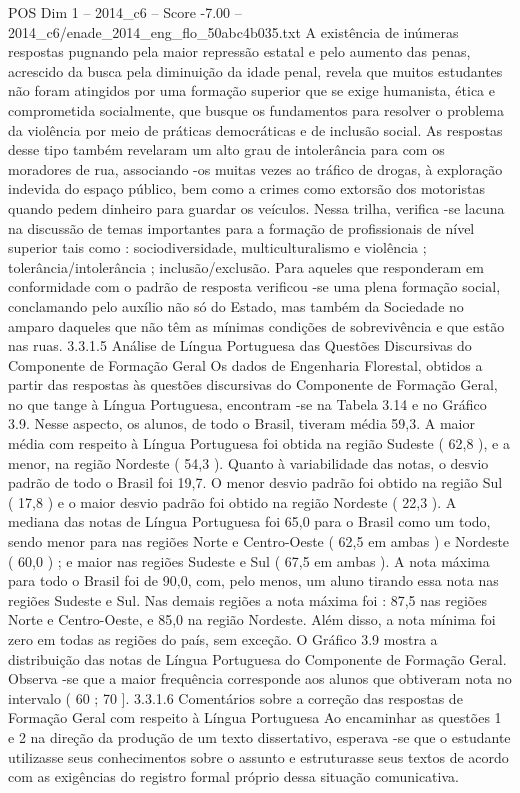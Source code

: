 \begin{textsample}{POS Dim 1 – 2014\_c6 – Score -7.00 – 2014\_c6/enade\_2014\_eng\_flo\_50abc4b035.txt}
A existência de inúmeras respostas pugnando pela maior repressão estatal e pelo aumento das penas, acrescido da busca pela diminuição da idade penal, revela que muitos estudantes não foram atingidos por uma formação superior que se exige humanista, ética e comprometida socialmente, que busque os fundamentos para resolver o problema da violência por meio de práticas democráticas e de inclusão social.
As respostas desse tipo também revelaram um alto grau de intolerância para com os moradores de rua, associando -os muitas vezes ao tráfico de drogas, à exploração indevida do espaço público, bem como a crimes como extorsão dos motoristas quando pedem dinheiro para guardar os veículos.
Nessa trilha, verifica -se lacuna na discussão de temas importantes para a formação de profissionais de nível superior tais como : sociodiversidade, multiculturalismo e violência ; tolerância/intolerância ; inclusão/exclusão.
Para aqueles que responderam em conformidade com o padrão de resposta verificou -se uma plena formação social, conclamando pelo auxílio não só do Estado, mas também da Sociedade no amparo daqueles que não têm as mínimas condições de sobrevivência e que estão nas ruas. 3.3.1.5 Análise de Língua Portuguesa das Questões Discursivas do Componente de Formação Geral Os dados de Engenharia Florestal, obtidos a partir das respostas às questões discursivas do Componente de Formação Geral, no que tange à Língua Portuguesa, encontram -se na Tabela 3.14 e no Gráfico 3.9.
Nesse aspecto, os alunos, de todo o Brasil, tiveram média 59,3.
A maior média com respeito à Língua Portuguesa foi obtida na região Sudeste ( 62,8 ), e a menor, na região Nordeste ( 54,3 ).
Quanto à variabilidade das notas, o desvio padrão de todo o Brasil foi 19,7.
O menor desvio padrão foi obtido na região Sul ( 17,8 ) e o maior desvio padrão foi obtido na região Nordeste ( 22,3 ).
A mediana das notas de Língua Portuguesa foi 65,0 para o Brasil como um todo, sendo menor para nas regiões Norte e Centro-Oeste ( 62,5 em ambas ) e Nordeste ( 60,0 ) ; e maior nas regiões Sudeste e Sul ( 67,5 em ambas ).
A nota máxima para todo o Brasil foi de 90,0, com, pelo menos, um aluno tirando essa nota nas regiões Sudeste e Sul.
Nas demais regiões a nota máxima foi : 87,5 nas regiões Norte e Centro-Oeste, e 85,0 na região Nordeste.
Além disso, a nota mínima foi zero em todas as regiões do país, sem exceção.
O Gráfico 3.9 mostra a distribuição das notas de Língua Portuguesa do Componente de Formação Geral.
Observa -se que a maior frequência corresponde aos alunos que obtiveram nota no intervalo ( 60 ; 70 ]. 3.3.1.6 Comentários sobre a correção das respostas de Formação Geral com respeito à Língua Portuguesa Ao encaminhar as questões 1 e 2 na direção da produção de um texto dissertativo, esperava -se que o estudante utilizasse seus conhecimentos sobre o assunto e estruturasse seus textos de acordo com as exigências do registro formal próprio dessa situação comunicativa.

\end{textsample}
